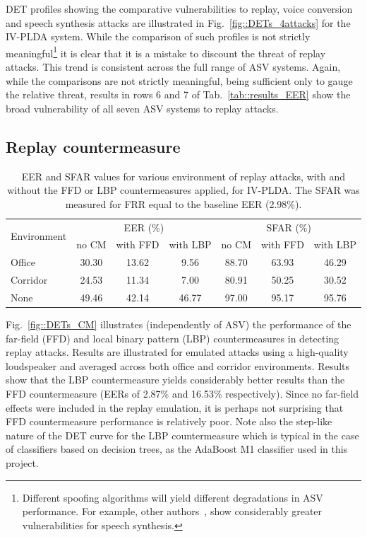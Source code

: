 DET profiles showing the comparative vulnerabilities to replay, voice conversion and speech synthesis attacks are illustrated in Fig.~\ref{fig::DETs_4attacks} for the IV-PLDA system.  While the comparison of such profiles is not strictly meaningful\footnote{Different spoofing algorithms will yield different degradations in ASV performance.  For example, other authors~\cite{DeLeon2012}, show considerably greater vulnerabilities for speech synthesis.} it is clear that it is a mistake to discount the threat of replay attacks.  This trend is consistent across the full range of ASV systems.  Again, while the comparisons are not strictly meaningful, being sufficient only to gauge the relative threat, results in rows 6 and 7 of Tab.~\ref{tab::results_EER} show the broad vulnerability of all seven ASV systems to replay attacks.





\subsection{Replay countermeasure}


\begin{table}
\renewcommand{\arraystretch}{1.2}
\begin{center}
    \begin{tabular}{ l || c c c | c c c}
    \hline
 \multirow{2}{*}{Environment}  & \multicolumn{3}{c|}{EER (\%)} & \multicolumn{3}{c}{SFAR (\%)} \\
     	 & no CM & with FFD & with LBP & no CM & with FFD & with LBP\\ 

 \hline \hline
Office   & 30.30 & 13.62 & 9.56 & 88.70 & 63.93 & 46.29\\
Corridor & 24.53 & 11.34 & 7.00 & 80.91 & 50.25 & 30.52\\
None & 49.46 & 42.14 & 46.77 & 97.00 & 95.17 & 95.76\\
\hline
    \end{tabular}
    \caption{EER and SFAR values for various environment of replay attacks, with and without the FFD or LBP countermeasures applied, for IV-PLDA. The SFAR was measured for FRR equal to the baseline EER (2.98\%).}
		\label{tab::results_CM_rooms}
   \end{center}
\end{table}




Fig.~\ref{fig::DETs_CM} illustrates (independently of ASV) the performance of the far-field (FFD) and local binary pattern (LBP) countermeasures in detecting replay attacks.  Results are illustrated for emulated attacks using a high-quality loudspeaker and averaged across both office and corridor environments.  
Results show that the LBP countermeasure yields considerably better results than the FFD countermeasure (EERs of 2.87\% and 16.53\% respectively).  Since no far-field effects were included in the replay emulation, it is perhaps not surprising that FFD countermeasure performance is relatively poor.  Note also the step-like nature of the DET curve for the LBP countermeasure which is typical in the case of classifiers based on decision trees, as the AdaBoost
M1 classifier used in this project.



